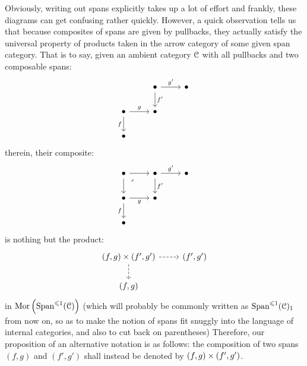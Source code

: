                 \begin{convention} \label{conv: span_notations}
                    Obviously, writing out spans explicitly takes up a lot of effort and frankly, these diagrams can get confusing rather quickly. However, a quick observation tells us that because composites of spans are given by pullbacks, they actually satisfy the universal property of products taken in the arrow category of some given span category. That is to say, given an ambient category $\mathcal{C}$ with all pullbacks and two composable spans:
                        $$
                            \begin{tikzcd}
                            	& \bullet & \bullet \\
                            	\bullet & \bullet \\
                            	\bullet
                            	\arrow["f"', from=2-1, to=3-1]
                            	\arrow["g", from=2-1, to=2-2]
                            	\arrow["{f'}", from=1-2, to=2-2]
                            	\arrow["{g'}", from=1-2, to=1-3]
                            \end{tikzcd}
                        $$
                    therein, their composite:
                        $$
                            \begin{tikzcd}
                            	\bullet & \bullet & \bullet \\
                            	\bullet & \bullet \\
                            	\bullet
                            	\arrow["f"', from=2-1, to=3-1]
                            	\arrow["g"', from=2-1, to=2-2]
                            	\arrow["{f'}", from=1-2, to=2-2]
                            	\arrow["{g'}", from=1-2, to=1-3]
                            	\arrow[from=1-1, to=2-1]
                            	\arrow[from=1-1, to=1-2]
                            	\arrow["\lrcorner"{anchor=center, pos=0.125}, draw=none, from=1-1, to=2-2]
                            \end{tikzcd}
                        $$
                    is nothing but the product:
                        $$
                            \begin{tikzcd}
                            	{(f, g) \x (f', g')} & {(f', g')} \\
                            	{(f, g)}
                            	\arrow[dashed, from=1-1, to=2-1]
                            	\arrow[dashed, from=1-1, to=1-2]
                            \end{tikzcd}
                        $$
                    in $\mathrm{Mor}\left(\mathrm{Span}^{\leqslant 1}(\mathcal{C})\right)$ (which will probably be commonly written as $\mathrm{Span}^{\leqslant 1}(\mathcal{C})_1$ from now on, so as to make the notion of spans fit snuggly into the language of internal categories, and also to cut back on parentheses) Therefore, our proposition of an alternative notation is as follows: the composition of two spans $(f, g)$ and $(f', g')$ shall instead be denoted by $(f, g) \x (f', g')$.
                \end{convention}
